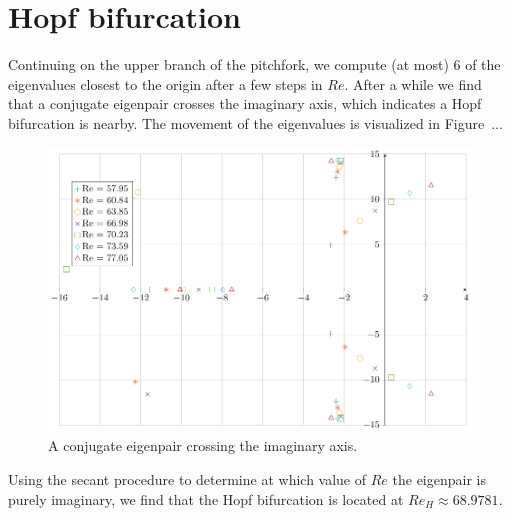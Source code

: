 \section{Hopf bifurcation}

Continuing on the upper branch of the pitchfork, we compute (at most) 6 of the eigenvalues closest to the origin after a few steps in $Re.$ After a while we find that a conjugate eigenpair crosses the imaginary axis, which indicates a Hopf bifurcation is nearby. The movement of the eigenvalues is visualized in Figure~...

\begin{figure}[h]
  \caption{A conjugate eigenpair crossing the imaginary axis.}
  \centerline{\includegraphics[width=\textwidth]{images/eigenwaarden_hopf.pdf}}
\end{figure}

Using the secant procedure to determine at which value of $Re$ the eigenpair is purely imaginary, we find that the Hopf bifurcation is located at $Re_H \approx 68.9781.$

